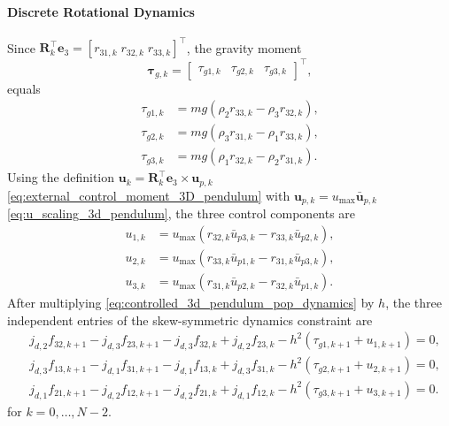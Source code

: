 \paragraph{Discrete Rotational Dynamics}

Since \(\bm{R}_k^{\top}\bm{e}_3=[r_{31,k}\;r_{32,k}\;r_{33,k}]^{\top}\), the
gravity moment
\[
\bm{\tau}_{g,k}=
\begin{bmatrix}\tau_{g1,k}&\tau_{g2,k}&\tau_{g3,k}\end{bmatrix}^{\top},
\]
equals
\begin{subequations}
\label{eq:app_3d_scalar_gravity}
\begin{align}
\tau_{g1,k}&=mg\left(\rho_2r_{33,k}-\rho_3r_{32,k}\right),\\
\tau_{g2,k}&=mg\left(\rho_3r_{31,k}-\rho_1r_{33,k}\right),\\
\tau_{g3,k}&=mg\left(\rho_1r_{32,k}-\rho_2r_{31,k}\right).
\end{align}
\end{subequations}
Using the definition
\(\bm{u}_k=\bm{R}_k^{\top}\bm{e}_3\times \bm{u}_{p,k}\) \eqref{eq:external_control_moment_3D_pendulum} with
\(\bm{u}_{p,k}=u_{\max}\bar{\bm{u}}_{p,k}\)
\eqref{eq:u_scaling_3d_pendulum}, the three control components are
\begin{subequations}
\label{eq:app_3d_scalar_control_moment}
\begin{align}
u_{1,k}&=u_{\max}
\left(r_{32,k}\bar u_{p3,k}-r_{33,k}\bar u_{p2,k}\right),\\
u_{2,k}&=u_{\max}
\left(r_{33,k}\bar u_{p1,k}-r_{31,k}\bar u_{p3,k}\right),\\
u_{3,k}&=u_{\max}
\left(r_{31,k}\bar u_{p2,k}-r_{32,k}\bar u_{p1,k}\right).
\end{align}
\end{subequations}
After multiplying
\eqref{eq:controlled_3d_pendulum_pop_dynamics} by \(h\), the three independent
entries of the skew-symmetric dynamics constraint are
\begin{subequations}
\label{eq:app_3d_scalar_dynamics}
\begin{align}
&j_{d,2}f_{32,k+1}-j_{d,3}f_{23,k+1}
-j_{d,3}f_{32,k}+j_{d,2}f_{23,k}
-h^2\left(\tau_{g1,k+1}+u_{1,k+1}\right)=0,
\label{eq:app_3d_scalar_dynamics_1}
\\
&j_{d,3}f_{13,k+1}-j_{d,1}f_{31,k+1}
-j_{d,1}f_{13,k}+j_{d,3}f_{31,k}
-h^2\left(\tau_{g2,k+1}+u_{2,k+1}\right)=0,
\label{eq:app_3d_scalar_dynamics_2}
\\
&j_{d,1}f_{21,k+1}-j_{d,2}f_{12,k+1}
-j_{d,2}f_{21,k}+j_{d,1}f_{12,k}
-h^2\left(\tau_{g3,k+1}+u_{3,k+1}\right)=0.
\label{eq:app_3d_scalar_dynamics_3}
\end{align}
\end{subequations}
for \(k=0,\ldots,N-2\).

